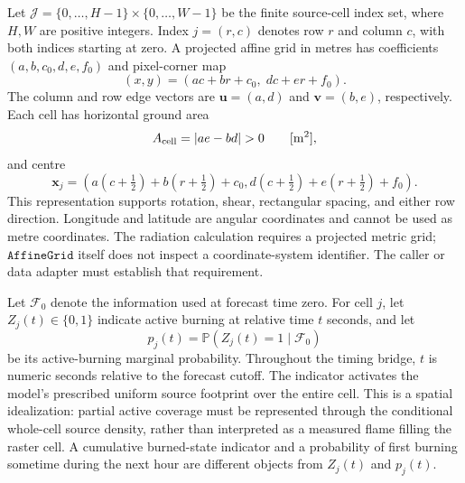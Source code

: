 \documentclass[11pt,a4paper]{article}
\begin{document}
Let $\mathcal J=\{0,\ldots,H-1\}\times\{0,\ldots,W-1\}$ be the finite
source-cell index set, where $H,W$ are positive integers. Index $j=(r,c)$
denotes row $r$ and column $c$, with both indices starting at zero. A projected
affine grid in metres has coefficients $(a,b,c_0,d,e,f_0)$ and pixel-corner map
\begin{equation}
 (x,y)=(ac+br+c_0,\;dc+er+f_0).
\end{equation}
The column and row edge vectors are $\mathbf u=(a,d)$ and $\mathbf v=(b,e)$,
respectively. Each cell has horizontal ground area
\begin{equation}
 A_{\rm cell}=|ae-bd|>0 \qquad[\mathrm{m^2}],
\end{equation}
and centre
\begin{equation}
 \mathbf x_j=(a(c+\tfrac12)+b(r+\tfrac12)+c_0,
              d(c+\tfrac12)+e(r+\tfrac12)+f_0).
\end{equation}
This representation supports rotation, shear, rectangular spacing, and either
row direction. Longitude and latitude are angular coordinates and cannot be
used as metre coordinates. The radiation calculation requires a projected
metric grid; $\texttt{AffineGrid}$ itself does not inspect a coordinate-system
identifier. The caller or data adapter must establish that requirement.

Let $\mathcal F_0$ denote the information used at forecast time zero. For
cell $j$, let $Z_j(t)\in\{0,1\}$ indicate active burning at relative time
$t$ seconds, and let
\begin{equation}
 p_j(t)=\mathbb P(Z_j(t)=1\mid\mathcal F_0)
\end{equation}
be its active-burning marginal probability. Throughout the timing bridge,
$t$ is numeric seconds relative to the forecast cutoff. The indicator activates the
model's prescribed uniform source footprint over the entire cell. This is a
spatial idealization: partial active coverage must be represented through the
conditional whole-cell source density, rather than interpreted as a measured
flame filling the raster cell. A cumulative burned-state indicator and a
probability of first burning sometime during the next hour are different
objects from $Z_j(t)$ and $p_j(t)$.
\end{document}
